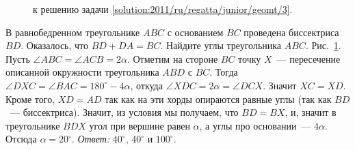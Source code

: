 \ifsolution
\begin{figure}\centering
    \caption{к решению задачи \ref{solution:2011/ru/regatta/junior/geomt/3}.}
    \label{fig:solution:2011/ru/regatta/junior/geomt/3}
\end{figure}%
\fi %

\problem
В равнобедренном треугольнике $ABC$ с основанием $BC$ проведена биссектриса
$BD$.
Оказалось, что $BD + DA = BC$.
Найдите углы треугольника $ABC$.
\solution
\label{solution:2011/ru/regatta/junior/geomt/3}%
Рис.~\ref{fig:solution:2011/ru/regatta/junior/geomt/3}.
Пусть $\angle ABC = \angle ACB = 2 \alpha$.
Отметим на стороне $BC$ точку $X$~--- пересечение описанной окружности
треугольника $ABD$ с $BC$.
Тогда
$\angle DXC = \angle BAC = 180^\circ - 4 \alpha$,
откуда $\angle XDC = 2 \alpha = \angle DCX$.
Значит $XC = XD$.
Кроме того, $XD = AD$ так как на эти хорды опираются равные углы
(так как $BD$~--- биссектриса).
Значит, из условия мы получаем, что $BD = BX$, и, значит в треугольнике $BDX$
угол при вершине равен $\alpha$, а углы про основании~--- $4 \alpha$.
Отсюда $\alpha = 20^\circ$.
\emph{Ответ:}
$40^\circ$, $40^\circ$ и $100^\circ$.
\endproblem
